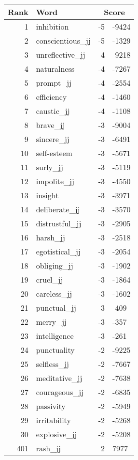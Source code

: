 \begin{longtable}[!htbp]{| rlr@{.}l |}
    \hline
    \textbf{Rank} & \textbf{Word} & \multicolumn{2}{c|}{\textbf{Score}} \\
    \hline
    \endhead
    1 & inhibition & -5 & -9424 \\
    2 & conscientious\_jj & -5 & -1329 \\
    3 & unreflective\_jj & -4 & -9218 \\
    4 & naturalness & -4 & -7267 \\
    5 & prompt\_jj & -4 & -2554 \\
    6 & efficiency & -4 & -1460 \\
    7 & caustic\_jj & -4 & -1108 \\
    8 & brave\_jj & -3 & -9004 \\
    9 & sincere\_jj & -3 & -6491 \\
    10 & self-esteem & -3 & -5671 \\
    11 & surly\_jj & -3 & -5119 \\
    12 & impolite\_jj & -3 & -4550 \\
    13 & insight & -3 & -3971 \\
    14 & deliberate\_jj & -3 & -3570 \\
    15 & distrustful\_jj & -3 & -2905 \\
    16 & harsh\_jj & -3 & -2518 \\
    17 & egotistical\_jj & -3 & -2054 \\
    18 & obliging\_jj & -3 & -1902 \\
    19 & cruel\_jj & -3 & -1864 \\
    20 & careless\_jj & -3 & -1602 \\
    21 & punctual\_jj & -3 & -409 \\
    22 & merry\_jj & -3 & -357 \\
    23 & intelligence & -3 & -261 \\
    24 & punctuality & -2 & -9225 \\
    25 & selfless\_jj & -2 & -7667 \\
    26 & meditative\_jj & -2 & -7638 \\
    27 & courageous\_jj & -2 & -6835 \\
    28 & passivity & -2 & -5949 \\
    29 & irritability & -2 & -5268 \\
    30 & explosive\_jj & -2 & -5208 \\
    401 & rash\_jj & 2 & 7977 \\

\end{longtable}
